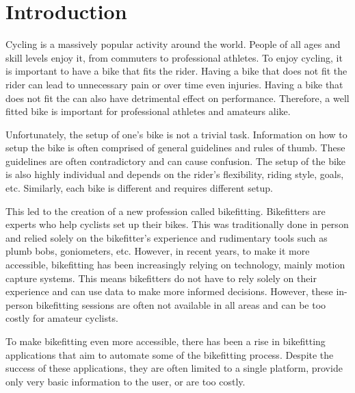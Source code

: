 
% 

\chapter{Introduction}
Cycling is a massively popular activity around the world. People of all ages and skill levels enjoy it, from commuters to professional athletes. To enjoy cycling, it is important to have a bike that fits the rider. Having a bike that does not fit the rider can lead to unnecessary pain or over time even injuries. Having a bike that does not fit the can also have detrimental effect on performance. Therefore, a well fitted bike is important for professional athletes and amateurs alike.

Unfortunately, the setup of one's bike is not a trivial task. Information on how to setup the bike is often comprised of general guidelines and rules of thumb. These guidelines are often contradictory and can cause confusion. The setup of the bike is also highly individual and depends on the rider's flexibility, riding style, goals, etc. Similarly, each bike is different and requires different setup.

This led to the creation of a new profession called bikefitting. Bikefitters are experts who help cyclists set up their bikes. This was traditionally done in person and relied solely on the bikefitter's experience and rudimentary tools such as plumb bobs, goniometers, etc. However, in recent years, to make it more accessible, bikefitting has been increasingly relying on technology, mainly motion capture systems. This means bikefitters do not have to rely solely on their experience and can use data to make more informed decisions. However, these in-person bikefitting sessions are often not available in all areas and can be too costly for amateur cyclists.

To make bikefitting even more accessible, there has been a rise in bikefitting applications that aim to automate some of the bikefitting process. Despite the success of these applications, they are often limited to a single platform, provide only very basic information to the user, or are too costly.

